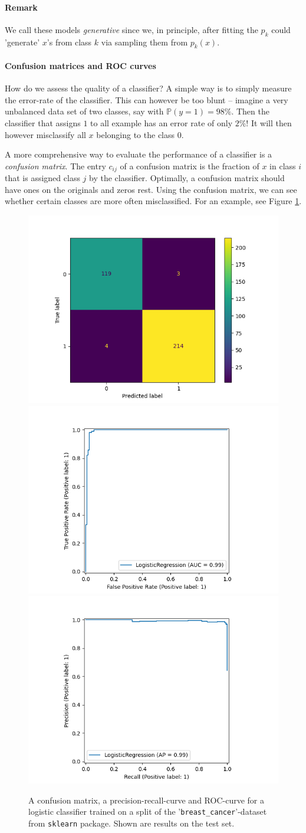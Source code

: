 \documentclass{article}
\begin{document}
\paragraph{Remark} We call these models \emph{generative} since we, in principle, after fitting the $p_k$ could 'generate' $x$'s from class $k$ via sampling them from $p_k(x)$. 

\paragraph{Confusion matrices and ROC curves} How do we assess the quality of a classifier? A simple way is to simply measure the error-rate of the classifier. This can however be too blunt -- imagine a very unbalanced data set of two classes, say with $\mathbb{P}(y=1)=98\%$. Then the classifier that assigns $1$ to all example has an error rate of only $2\%$! It will then however misclassify all $x$ belonging to the class $0$.

A more comprehensive way to evaluate the performance of a classifier is a \emph{confusion matrix}. The entry $c_{ij}$ of a confusion matrix is the fraction of $x$ in class $i$ that is assigned class $j$ by the classifier. Optimally, a confusion matrix should have ones on the originals and zeros rest. Using the confusion matrix, we can see whether certain classes are more often misclassified. For an example, see Figure \ref{fig:error_metrix}.

\begin{figure}
    \centering
    \includegraphics[width=0.31\linewidth]{graphics/confusion_matrix.png}
    \includegraphics[width=0.31\linewidth]{graphics/pr.png}
    \includegraphics[width=0.31\linewidth]{graphics/roc.png}
    \caption{A confusion matrix, a precision-recall-curve and ROC-curve for a logistic classifier trained on a split of the '\texttt{breast\_cancer}'-dataset from \texttt{sklearn} package. Shown are results on the test set.}
    \label{fig:error_metrix}
\end{figure}
\end{document}
